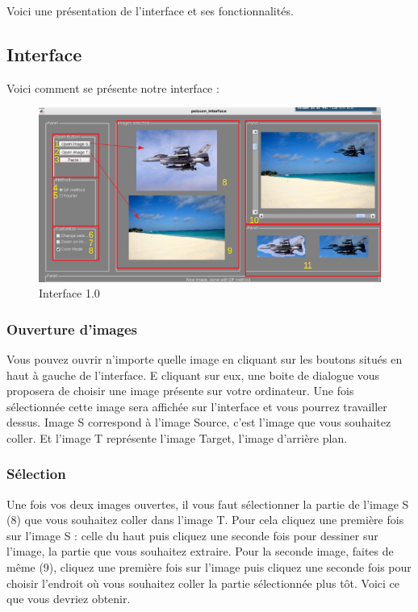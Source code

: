 Voici une présentation de l'interface et ses fonctionnalités.

\subsection{Interface}
Voici comment se présente notre interface : 
\begin{figure}[!h]
    \centering
    \includegraphics[scale = 0.5]{Images/interface.png}
    \caption{Interface 1.0}
\end{figure}{}
\subsubsection{Ouverture d'images}
Vous pouvez ouvrir n'importe quelle image en cliquant sur les boutons situés en haut à gauche de l'interface. E cliquant sur eux, une boite de dialogue vous proposera de choisir une image présente sur votre ordinateur. Une fois sélectionnée cette image sera affichée sur l'interface et vous pourrez travailler dessus. Image S correspond à l'image Source, c'est l'image que vous souhaitez coller. Et l'image T représente l'image Target, l'image d'arrière plan.\newline
\subsubsection{Sélection}
Une fois vos deux images ouvertes, il vous faut sélectionner la partie de l'image S (8) que vous souhaitez coller dans l'image T. Pour cela cliquez une première fois sur l'image S : celle du haut puis cliquez une seconde fois pour dessiner sur l'image, la partie que vous souhaitez extraire. 
\newline
Pour la seconde image, faites de même (9), cliquez une première fois sur l'image puis cliquez une seconde fois pour choisir l'endroit où vous souhaitez coller la partie sélectionnée plus tôt.  Voici ce que vous devriez obtenir. 
